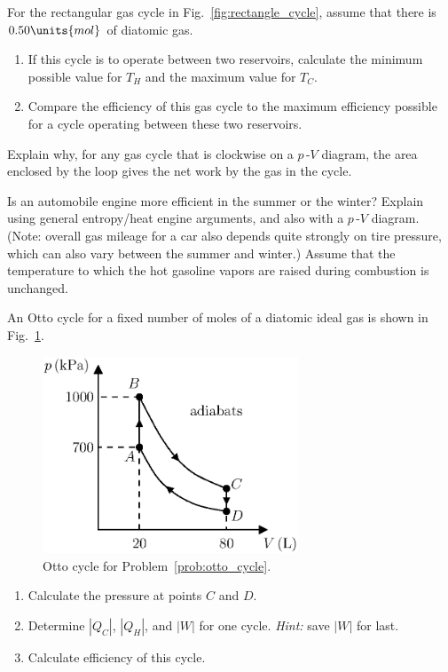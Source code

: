 \begin{problem} 
  For the rectangular gas cycle in Fig.~\ref{fig:rectangle_cycle},
  assume that there is $0.50\units{mol}$ of diatomic gas.
  \begin{enumerate}
  \item If this cycle is to operate between two reservoirs, calculate
    the minimum possible value for $T_H$ and the maximum value for
    $T_C$.
  \item Compare the efficiency of this gas cycle to the maximum
    efficiency possible for a cycle operating between these two
    reservoirs.
  \end{enumerate}
\label{prob:rectangularcycle}
\end{problem}

\begin{problem} 
  Explain why, for any gas cycle that is clockwise on a $p$\,-$V$
  diagram, the area enclosed by the loop gives the net work by the gas
  in the cycle.
\end{problem}

\begin{problem} 
  Is an automobile engine more efficient in the summer or the 
  winter?
  Explain using general entropy/heat engine arguments, and also with a
  $p$\,-$V$ diagram. (Note:  overall gas mileage for a car also depends
  quite strongly on tire pressure, which can also vary between the summer
  and winter.)  Assume that the temperature to which the hot gasoline vapors
are raised during  combustion  is unchanged.
\end{problem}

\begin{problem} 
  An Otto cycle for a fixed number of moles of a diatomic ideal gas is shown in
  Fig.~\ref{fig:otto_cycle_hw}. 
  \begin{figure}[h]
    \begin{center}
      \includegraphics[width=3in]{heat_engines/otto_cycle_hw.eps}
      \caption{Otto cycle for Problem~\ref{prob:otto_cycle}.}
      \label{fig:otto_cycle_hw}
    \end{center}
  \end{figure}
   \begin{enumerate}
   \item Calculate the pressure at points $C$ and $D$.
   \item Determine $|Q_C|$, $|Q_H|$, and $|W|$ for one cycle.  {\it
       Hint:} save $|W|$ for last.
   \item Calculate efficiency of this cycle. 
   \end{enumerate}
   \label{prob:otto_cycle}
\end{problem}

